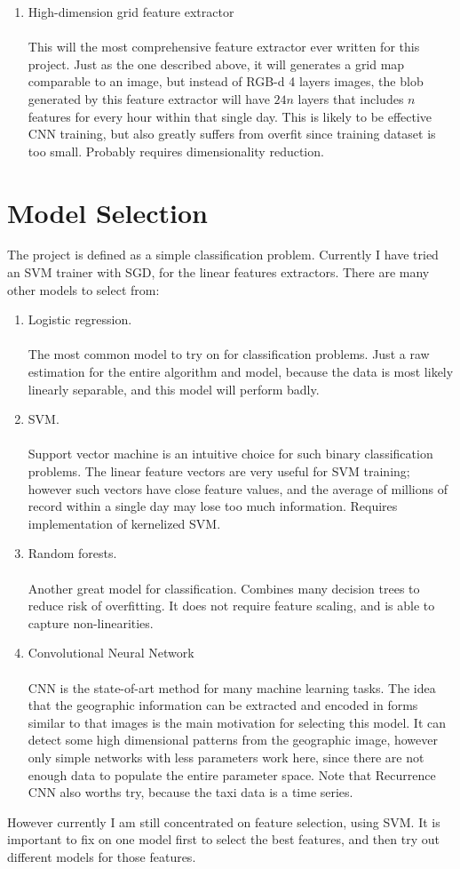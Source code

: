 \documentclass[a4paper]{article}
\begin{document}
\begin{enumerate}
\item High-dimension grid feature extractor\\\\
This will the most comprehensive feature extractor ever written for this project. Just as the one described above, it will generates a grid map comparable to an image, but instead of RGB-d 4 layers images, the blob generated by this feature extractor will have $24n$ layers that includes $n$ features for every hour within that single day. This is likely to be effective CNN training, but also greatly suffers from overfit since training dataset is too small. Probably requires dimensionality reduction.
\end{enumerate}
\section{Model Selection}
The project is defined as a simple classification problem. Currently I have tried an SVM trainer with SGD, for the linear features extractors. 
There are many other models to select from:
\begin{enumerate}
\item Logistic regression. \\\\
The most common model to try on for classification problems. Just a raw estimation for the entire algorithm and model, because the data is most likely linearly separable, and this model will perform badly. 
\item SVM. \\\\
Support vector machine is an intuitive choice for such binary classification problems. The linear feature vectors are very useful for SVM training; however such vectors have close feature values, and the average of millions of record within a single day may lose too much information. Requires implementation of kernelized SVM. 
\item Random forests. \\\\
Another great model for classification. Combines many decision trees to reduce risk of overfitting. It does not require feature scaling, and is able to capture non-linearities. 
\item Convolutional Neural Network\\\\
CNN is the state-of-art method for many machine learning tasks. The idea that the geographic information can be extracted and encoded in forms similar to that images is the main motivation for selecting this model. It can detect some high dimensional patterns from the geographic image, however only simple networks with less parameters work here, since there are not enough data to populate the entire parameter space. Note that Recurrence CNN also worths try, because the taxi data is a time series.
\end{enumerate}
However currently I am still concentrated on feature selection, using SVM. It is important to fix on one model first to select the best features, and then try out different models for those features. 
\end{document}
